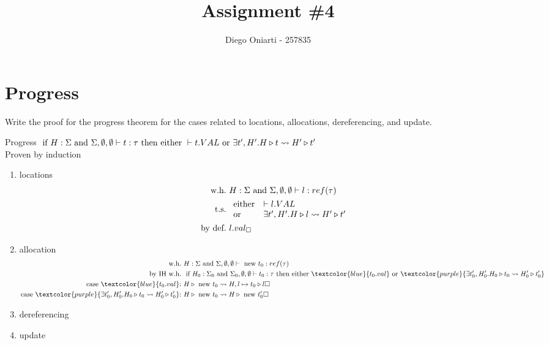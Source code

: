 \documentclass{article}
\title{Assignment \#4}
\author{Diego Oniarti - 257835}
\date{}
\begin{document}
\maketitle

\section{Progress}
Write the proof for the progress theorem for the cases related to locations, allocations, dereferencing, and update.
\begin{esempio}{Progress}
    $\text{ if } H:\Sigma\text{ and }\Sigma,\emptyset,\emptyset\vdash  t:\tau \text{ then } \text{either } \vdash t.VAL \text{ or } \exists t',H'.H\triangleright t \leadsto H'\triangleright t'$ \\
    Proven by induction
\end{esempio}
\begin{enumerate}
    \item locations
        \begin{align*}
            \text{w.h.} &\ H:\Sigma \AND \Sigma,\emptyset,\emptyset\vdash l:ref(\tau) \\
            \text{t.s.} &\ 
            \begin{array}{ll}
                \text{either}  & \vdash l.VAL \\
                \text{or}  & \exists t',H'. H\triangleright l \leadsto H'\triangleright t'
            \end{array} \\
            \text{by def.} &\ l.val_\square
        \end{align*}
    \item allocation
        \begin{align*}
            \text{w.h.} &\ H:\Sigma\AND \Sigma,\emptyset,\emptyset\vdash \NEW t_0: ref(\tau) \\
            \text{by IH w.h.} &\ \IF H_0:\Sigma_0 \AND \Sigma_0,\emptyset,\emptyset\vdash t_0:\tau \THEN \text{either } \textcolor{blue}{t_0.val} \OR \textcolor{purple}{\exists t_0',H_0'. H_0\triangleright t_0 \leadsto H_0'\triangleright t_0'} \\
            \text{case $\textcolor{blue}{t_0.val}$:} &\ H\triangleright\NEW t_0 \leadsto H,l\mapsto t_0\triangleright l \square \\
            \text{case $\textcolor{purple}{\exists t_0',H_0'. H_0\triangleright t_0 \leadsto H_0'\triangleright t_0'}$:} &\ H\triangleright\NEW t_0 \leadsto H\triangleright \NEW t_0' \square \\
        \end{align*}
    \item dereferencing
    \item update
\end{enumerate}
\end{document}
